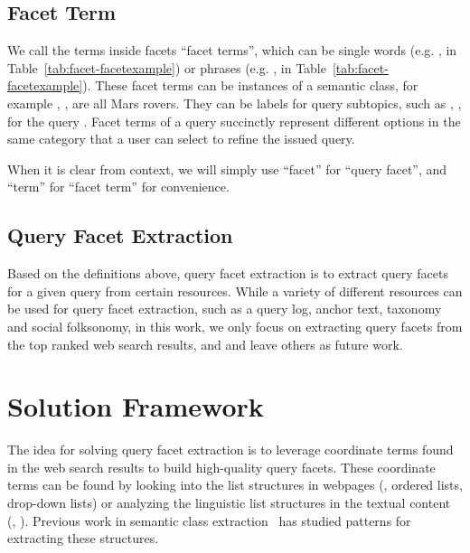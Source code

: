 \subsection{Facet Term}
We call the terms inside facets ``facet terms'', which can be single words (e.g. ,  in Table~\ref{tab:facet-facetexample}) or phrases (e.g. ,  in Table~\ref{tab:facet-facetexample}). 
These facet terms can be instances of a semantic class, for example , ,  are all Mars rovers. They can be labels for query subtopics, such as , ,  for the query . Facet terms of a query succinctly represent different options in the same category that a user can select to refine the issued query. 

When it is clear from context, we will simply use ``facet'' for ``query facet'', and ``term'' for ``facet term'' for convenience.

\subsection{Query Facet Extraction}
Based on the definitions above, query facet extraction is to extract query facets for a given query from certain resources. While a variety of different resources can be used for query facet extraction, such as a query log, anchor text, taxonomy and social folksonomy, in this work, we only focus on extracting query facets from the top ranked web search results, and and leave others as future work.

\section{Solution Framework}
\label{sec:facet-framework}
The idea for solving query facet extraction is to leverage coordinate terms found in the web search results to build high-quality query facets. These coordinate terms can be found by looking into the list structures in webpages (\eg, ordered lists, drop-down lists) or analyzing the linguistic list structures in the textual content (\eg, ).
Previous work in semantic class extraction~\cite{hearst1992automatic,pasca2004acquisition,kozareva2008semantic,shi2010corpus} has studied patterns for extracting these structures. 

